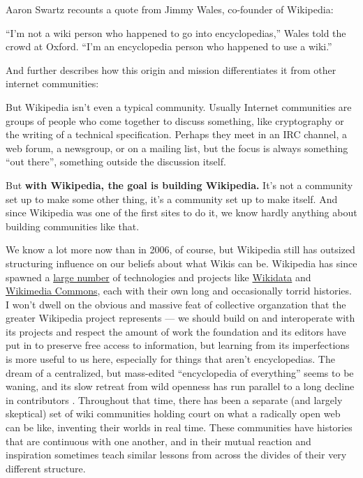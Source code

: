 Aaron Swartz recounts a quote from Jimmy Wales, co-founder of Wikipedia:

\begin{leftbar}
``I'm not a wiki person who happened to go into encyclopedias,'' Wales
told the crowd at Oxford. ``I'm an encyclopedia person who happened to
use a wiki.'' \citep{swartzWhoWritesWikipedia2006} 
\end{leftbar}

And further describes how this origin and mission differentiates it from
other internet communities:

\begin{leftbar}
But Wikipedia isn't even a typical community. Usually Internet
communities are groups of people who come together to discuss something,
like cryptography or the writing of a technical specification. Perhaps
they meet in an IRC channel, a web forum, a newsgroup, or on a mailing
list, but the focus is always something ``out there'', something outside
the discussion itself.

But \textbf{with Wikipedia, the goal is building Wikipedia.} It's not a
community set up to make some other thing, it's a community set up to
make itself. And since Wikipedia was one of the first sites to do it, we
know hardly anything about building communities like that. \citep{swartzMakingMoreWikipedias2006} 
\end{leftbar}

We know a lot more now than in 2006, of course, but Wikipedia still has
outsized structuring influence on our beliefs about what Wikis can be.
Wikipedia has since spawned a
\href{https://meta.wikimedia.org/wiki/Complete_list_of_Wikimedia_projects}{large
number} of technologies and projects like
\href{https://meta.wikimedia.org/wiki/Wikidata}{Wikidata} and
\href{https://commons.wikimedia.org/wiki/Main_Page}{Wikimedia Commons},
each with their own long and occasionally torrid histories. I won't
dwell on the obvious and massive feat of collective organzation that the
greater Wikipedia project represents --- we should build on and
interoperate with its projects and respect the amount of work the
foundation and its editors have put in to preserve free access to
information, but learning from its imperfections is more useful to us
here, especially for things that aren't encyclopedias. The dream of a
centralized, but mass-edited ``encyclopedia of everything'' seems to be
waning, and its slow retreat from wild openness has run parallel to a
long decline in contributors \citep{hillWikipediaEndOpen2019, halfakerRiseDeclineOpen2013} . Throughout that time, there has been a
separate (and largely skeptical) set of wiki communities holding court
on what a radically open web can be like, inventing their worlds in real
time. These communities have histories that are continuous with one
another, and in their mutual reaction and inspiration sometimes teach
similar lessons from across the divides of their very different
structure.


